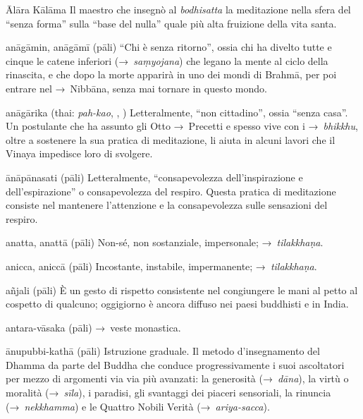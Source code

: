 \begin{glossarydescription}
\item[Ālāra Kālāma] Il maestro che insegnò al \emph{bodhisatta} la meditazione
  nella sfera del ``senza forma'' sulla ``base del nulla'' quale più alta
  fruizione della vita santa.

\item[anāgāmin, anāgāmī] (pāli) ``Chi è senza ritorno'', ossia chi ha divelto
  tutte e cinque le catene inferiori (→~\emph{saṃyojana}) che legano la mente al
  ciclo della rinascita, e che dopo la morte apparirà in uno dei mondi di
  Brahmā, per poi entrare nel →~Nibbāna, senza mai tornare in questo
  mondo.

\item[anāgārika] (thai: \emph{pah-kao}, , )
  Letteralmente, ``non cittadino'', ossia ``senza casa''. Un postulante che ha
  assunto gli Otto →~Precetti e spesso vive con i →~\emph{bhikkhu}, oltre a
  sostenere la sua pratica di meditazione, li aiuta in alcuni lavori che il
  Vinaya impedisce loro di svolgere.

\item[ānāpānasati] (pāli) Letteralmente, ``consapevolezza dell'inspirazione e
  dell'espirazione'' o consapevolezza del respiro. Questa pratica di meditazione
  consiste nel mantenere l'attenzione e la consapevolezza sulle sensazioni del
  respiro.

\item[anatta, anattā] (pāli) Non-sé, non sostanziale, impersonale;
  →~\emph{tilakkhaṇa}.

\item[anicca, aniccā] (pāli) Incostante, instabile, impermanente;
  →~\emph{tilakkhaṇa}.

\item[añjali] (pāli) È un gesto di rispetto consistente nel congiungere le mani
  al petto al cospetto di qualcuno; oggigiorno è ancora diffuso nei paesi
  buddhisti e in India.

\item[antara-vāsaka] (pāli) →~veste monastica.

\item[ānupubbi-kathā] (pāli) Istruzione graduale. Il metodo d'insegnamento del
  Dhamma da parte del Buddha che conduce progressivamente i suoi ascoltatori per
  mezzo di argomenti via via più avanzati: la generosità (→~\emph{dāna}), la
  virtù o moralità (→~\emph{sīla}), i paradisi, gli svantaggi dei piaceri
  sensoriali, la rinuncia (→~\emph{nekkhamma}) e le Quattro Nobili Verità
  (→~\emph{ariya-sacca}).


\end{glossarydescription}
